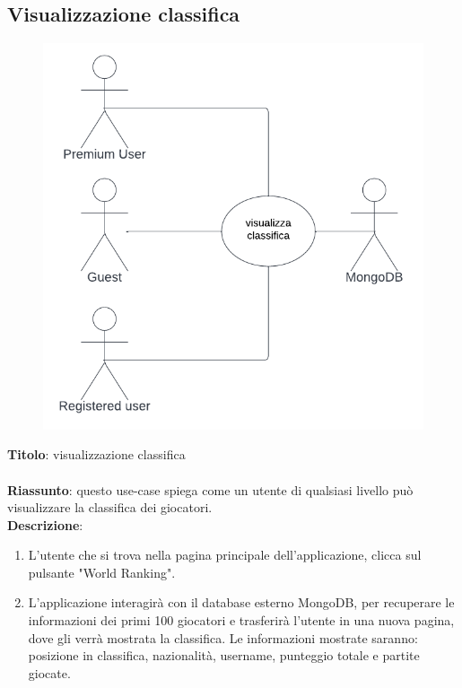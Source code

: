 \subsection{Visualizzazione classifica} \label{req_visualizzazione_classifica}
\begin{figure}[!h]
\centering
\includegraphics[scale=0.35]{images/use_case_visualizza_classifica.png}
\end{figure}
\noindent
\textbf{Titolo}: visualizzazione classifica \\
\\
\textbf{Riassunto}: questo use-case spiega come un utente di qualsiasi livello può visualizzare la classifica dei giocatori. \\
\textbf{Descrizione}:
\begin{enumerate}
    \item L'utente che si trova nella pagina principale dell'applicazione, clicca sul pulsante "World Ranking".
    \item L'applicazione interagirà con il database esterno MongoDB, per recuperare le informazioni dei primi 100 giocatori e trasferirà l'utente in una nuova pagina, dove gli verrà mostrata la classifica. Le informazioni mostrate saranno: posizione in classifica, nazionalità, username, punteggio totale e partite giocate.
\end{enumerate}

